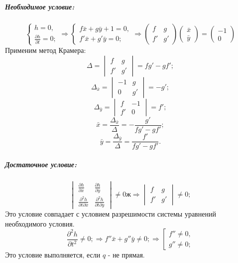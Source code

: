 \subparagraph{Необходимое условие:}
$$
\left\{
\begin{gathered}
	h = 0, \\
	\frac{\partial h}{\partial t} = 0;
\end{gathered}
\right.
\Rightarrow
\left\{
\begin{gathered}
	f\bar{x} + g\bar{y} + 1 = 0, \\
	f'\bar{x} + g'\bar{y} = 0;
\end{gathered}
\right.
\Rightarrow
\begin{pmatrix}
	f & g \\
	f' & g'
\end{pmatrix}
\begin{pmatrix}
	\bar{x} \\
	\bar{y}
\end{pmatrix}
=
\begin{pmatrix}
	-1 \\
	0
\end{pmatrix}
$$
Применим метод Крамера:
$$
\Delta = 
\begin{vmatrix}
	f & g \\
	f' & g'
\end{vmatrix}
= f g' - g f';
$$
$$\Delta_{\bar{x}} = 
\begin{vmatrix}
	-1 & g \\
	0 & g'
\end{vmatrix}
= - g';
$$
$$\Delta_{\bar{y}} = 
\begin{vmatrix}
	f & -1 \\
	f' & 0
\end{vmatrix}
= f';
$$
$$\bar{x} = \frac{\Delta_{\bar{x}}}{\Delta} = -\frac{g'}{f g' - g f'};$$
$$\bar{y} = \frac{\Delta_{\bar{y}}}{\Delta} = \frac{f'}{f g' - g f'}.$$

\subparagraph{Достаточное условие:}
$$
\begin{vmatrix}
	\frac{\partial h}{\partial \bar{x}} & \frac{\partial h}{\partial \bar{y}} \\
	\frac{\partial^2 h}{\partial t \partial\bar{x}} & \frac{\partial^2 h}{\partial t \partial\bar{y}}
\end{vmatrix}
\ne 0ж
\Rightarrow
\begin{vmatrix}
	f & g \\
	f' & g'
\end{vmatrix}
\ne 0;
$$
Это условие совпадает с условием разрешимости системы уравнений необходимого условия.
$$
\frac{\partial^2 h}{\partial t^2} \ne 0;
\Rightarrow
f''\bar{x} + g''\bar{y} \ne 0;
\Rightarrow
\left[
\begin{gathered}
	f'' \ne 0, \\
	g'' \ne 0;
\end{gathered}
\right.
$$
Это условие выполняется, если $q$ - не прямая.
